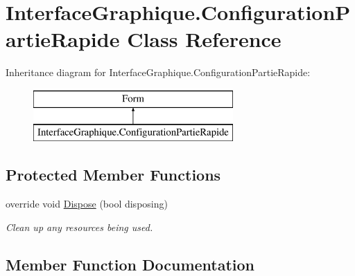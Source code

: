 \hypertarget{class_interface_graphique_1_1_configuration_partie_rapide}{}\section{Interface\+Graphique.\+Configuration\+Partie\+Rapide Class Reference}
\label{class_interface_graphique_1_1_configuration_partie_rapide}
Inheritance diagram for Interface\+Graphique.\+Configuration\+Partie\+Rapide\+:\begin{figure}[H]
\begin{center}
\leavevmode
\includegraphics[height=2.000000cm]{class_interface_graphique_1_1_configuration_partie_rapide}
\end{center}
\end{figure}
\subsection*{Protected Member Functions}
\begin{DoxyCompactItemize}
\item 
override void \hyperlink{class_interface_graphique_1_1_configuration_partie_rapide_a783af7dcd620d9b43374b22218a878ea}{Dispose} (bool disposing)
\begin{DoxyCompactList}\small\item\em Clean up any resources being used. \end{DoxyCompactList}\end{DoxyCompactItemize}


\subsection{Member Function Documentation}
\hypertarget{class_interface_graphique_1_1_configuration_partie_rapide_a783af7dcd620d9b43374b22218a878ea}{}\label{class_interface_graphique_1_1_configuration_partie_rapide_a783af7dcd620d9b43374b22218a878ea} 
